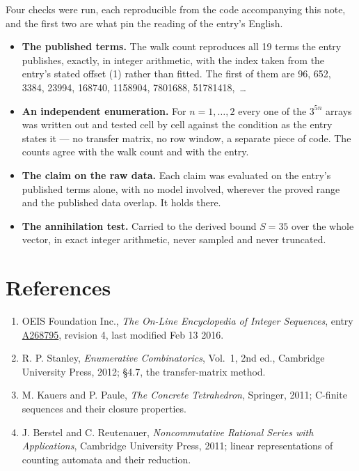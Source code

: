 \documentclass[11pt]{article}
\theoremstyle{definition}
\begin{document}
Four checks were run, each reproducible from the code accompanying this note, and the first two are what pin the reading of the entry's English.

\begin{itemize}

\item {\bfseries The published terms.} The walk count reproduces all 19 terms the entry publishes, exactly, in integer arithmetic, with the index taken from the entry's stated offset (1) rather than fitted. The first of them are 96, 652, 3384, 23994, 168740, 1158904, 7801688, 51781418,~\dots

\item {\bfseries An independent enumeration.} For $n = 1,\dots,2$ every one of the $3^{5n}$ arrays was written out and tested cell by cell against the condition as the entry states it --- no transfer matrix, no row window, a separate piece of code. The counts agree with the walk count and with the entry.

\item {\bfseries The claim on the raw data.} Each claim was evaluated on the entry's published terms alone, with no model involved, wherever the proved range and the published data overlap. It holds there.

\item {\bfseries The annihilation test.} Carried to the derived bound $S = 35$ over the whole vector, in exact integer arithmetic, never sampled and never truncated.

\end{itemize}

\section{References}

\begin{enumerate}

\item OEIS Foundation Inc., \emph{The On-Line Encyclopedia of Integer Sequences}, entry \href{https://oeis.org/A268795}{A268795}, revision 4, last modified Feb 13 2016.

\item R. P. Stanley, \emph{Enumerative Combinatorics}, Vol.~1, 2nd ed., Cambridge University Press, 2012; \S4.7, the transfer-matrix method.

\item M. Kauers and P. Paule, \emph{The Concrete Tetrahedron}, Springer, 2011; C-finite sequences and their closure properties.

\item J. Berstel and C. Reutenauer, \emph{Noncommutative Rational Series with Applications}, Cambridge University Press, 2011; linear representations of counting automata and their reduction.

\end{enumerate}
\end{document}
